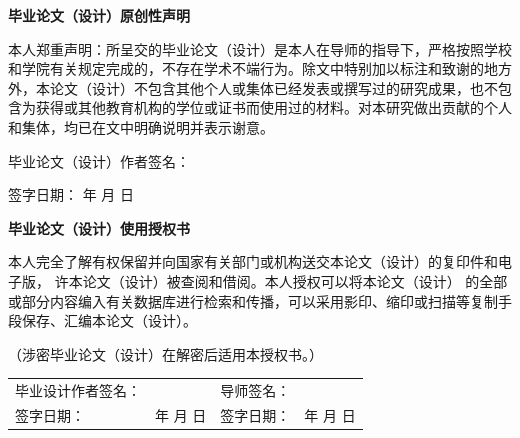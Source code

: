 
\begin{center}
    \bfseries {} 毕业论文（设计）原创性声明
\end{center}

{
    \setlength{\parindent}{2em}

    本人郑重声明：所呈交的毕业论文（设计）是本人在导师的指导下，严格按照学校和学院有关规定完成的，不存在学术不端行为。除文中特别加以标注和致谢的地方外，本论文（设计）不包含其他个人或集体已经发表或撰写过的研究成果，也不包含为获得或其他教育机构的学位或证书而使用过的材料。对本研究做出贡献的个人和集体，均已在文中明确说明并表示谢意。

    \vspace{0em}

    \noindent
    \hspace{6em} 毕业论文（设计）作者签名：

    \vspace{0.5em}

    \noindent
    \hspace{14em} 签字日期：\hspace{4em} 年 \quad 月 \quad 日
}

\vspace{3em}

\begin{center}
    \bfseries {} 毕业论文（设计）使用授权书
\end{center}

{
    \setlength{\parindent}{2em}
    \sloppy                          %
    \setlength{\emergencystretch}{3em} %

    本人完全了解有权保留并向国家有关部门或机构送交本论文（设计）的复印件和电子版，
    许本论文（设计）被查阅和借阅。本人授权可以将本论文（设计）
    的全部或部分内容编入有关数据库进行检索和传播，可以采用影印、缩印或扫描等复制手段保存、汇编本论文（设计）。

    （涉密毕业论文（设计）在解密后适用本授权书。）

    \vspace{2em}

    \begin{center}
        \begin{tabularx}{\linewidth}{>{\fangsong}l>{\fangsong}X>{\fangsong}l>{\fangsong}X}
            毕业设计作者签名： & ~ & 导师签名： & ~ \\

            \vspace{0.4em}

            签字日期： & 年 \quad 月 \quad 日 & 签字日期： & 年 \quad 月 \quad 日 \\
        \end{tabularx}
    \end{center}
}
